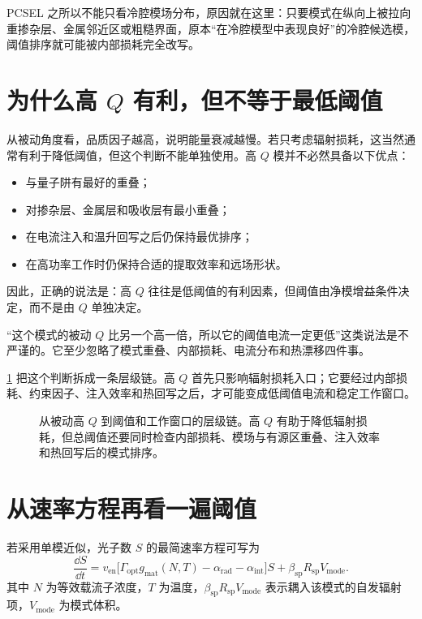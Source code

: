 

PCSEL 之所以不能只看冷腔模场分布，原因就在这里：只要模式在纵向上被拉向重掺杂层、金属邻近区或粗糙界面，原本“在冷腔模型中表现良好”的冷腔候选模，阈值排序就可能被内部损耗完全改写。

\section[为什么高 Q 有利，但不等于最低阈值]{为什么高 $Q$ 有利，但不等于最低阈值}
从被动角度看，品质因子越高，说明能量衰减越慢。若只考虑辐射损耗，这当然通常有利于降低阈值，但这个判断不能单独使用。高 $Q$ 模并不必然具备以下优点：
\begin{itemize}
  \item 与量子阱有最好的重叠；
  \item 对掺杂层、金属层和吸收层有最小重叠；
  \item 在电流注入和温升回写之后仍保持最优排序；
  \item 在高功率工作时仍保持合适的提取效率和远场形状。
\end{itemize}

因此，正确的说法是：高 $Q$ 往往是低阈值的有利因素，但阈值由净模增益条件决定，而不是由 $Q$ 单独决定。

\begin{PitfallBox}
“这个模式的被动 $Q$ 比另一个高一倍，所以它的阈值电流一定更低”这类说法是不严谨的。它至少忽略了模式重叠、内部损耗、电流分布和热漂移四件事。
\end{PitfallBox}

\cref{fig:ch07_q_threshold_decision_chain} 把这个判断拆成一条层级链。高 $Q$ 首先只影响辐射损耗入口；它要经过内部损耗、约束因子、注入效率和热回写之后，才可能变成低阈值电流和稳定工作窗口。

\begin{figure}[htbp]
  \centering
  
  \caption{从被动高 $Q$ 到阈值和工作窗口的层级链。高 $Q$ 有助于降低辐射损耗，但总阈值还要同时检查内部损耗、模场与有源区重叠、注入效率和热回写后的模式排序。}
  \label{fig:ch07_q_threshold_decision_chain}
\end{figure}

\section{从速率方程再看一遍阈值}
若采用单模近似，光子数 $S$ 的最简速率方程可写为
\begin{equation}
\frac{\dd S}{\dd t} = v_{\mathrm{en}}\bigl[\Gamma_{\mathrm{opt}} g_{\mathrm{mat}}(N,T)-\alpha_{\mathrm{rad}}-\alpha_{\mathrm{int}}\bigr]S + \beta_{\mathrm{sp}}R_{\mathrm{sp}} V_{\mathrm{mode}}.
\label{eq:photon_rate}
\end{equation}
其中 $N$ 为等效载流子浓度，$T$ 为温度，$\beta_{\mathrm{sp}}R_{\mathrm{sp}} V_{\mathrm{mode}}$ 表示耦入该模式的自发辐射项，$V_{\mathrm{mode}}$ 为模式体积。


